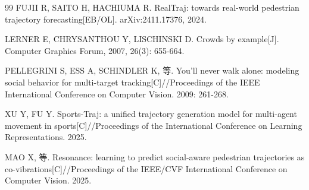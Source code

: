 \begin{thebibliography}{99}
FUJII R, SAITO H, HACHIUMA R. RealTraj: towards real-world pedestrian trajectory forecasting[EB/OL]. arXiv:2411.17376, 2024.

LERNER E, CHRYSANTHOU Y, LISCHINSKI D. Crowds by example[J]. Computer Graphics Forum, 2007, 26(3): 655-664.

PELLEGRINI S, ESS A, SCHINDLER K, 等. You'll never walk alone: modeling social behavior for multi-target tracking[C]//Proceedings of the IEEE International Conference on Computer Vision. 2009: 261-268.

XU Y, FU Y. Sports-Traj: a unified trajectory generation model for multi-agent movement in sports[C]//Proceedings of the International Conference on Learning Representations. 2025.

MAO X, 等. Resonance: learning to predict social-aware pedestrian trajectories as co-vibrations[C]//Proceedings of the IEEE/CVF International Conference on Computer Vision. 2025.

\end{thebibliography}
